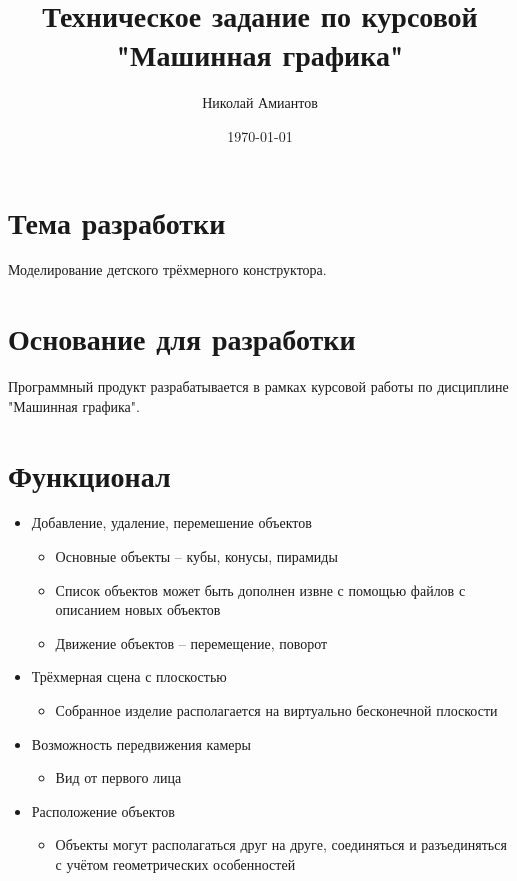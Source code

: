 \documentclass[a4paper,12pt]{article}
\title{Техническое задание по курсовой "Машинная графика"}
\author{Николай Амиантов}
\date{\today}
\begin{document}
\section{Тема разработки}

Моделирование детского трёхмерного конструктора.

\section{Основание для разработки}

Программный продукт разрабатывается в рамках курсовой работы по дисциплине "Машинная графика".

\section{Функционал}
\begin{itemize}
  \item Добавление, удаление, перемешение объектов
  \begin{itemize}
    \item Основные объекты -- кубы, конусы, пирамиды
    \item Список объектов может быть дополнен извне с помощью файлов с описанием новых объектов
    \item Движение объектов -- перемещение, поворот
  \end{itemize}
  \item Трёхмерная сцена с плоскостью
  \begin{itemize}
    \item Собранное изделие располагается на виртуально бесконечной плоскости
  \end{itemize}
  \item Возможность передвижения камеры
  \begin{itemize}
    \item Вид от первого лица
  \end{itemize}
  \item Расположение объектов
  \begin{itemize}
    \item Объекты могут располагаться друг на друге, соединяться и разъединяться с учётом геометрических особенностей
  \end{itemize}
\end{itemize}
\end{document}
